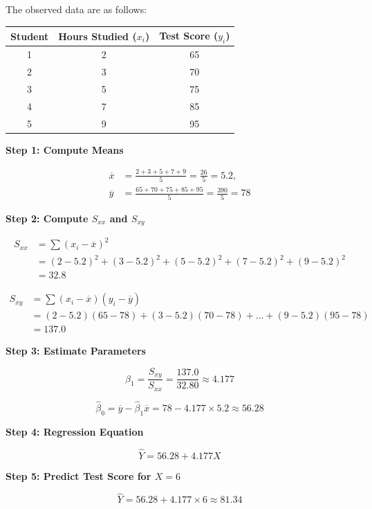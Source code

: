 \documentclass[twoside]{book}
\begin{document}
The observed data are as follows:

\begin{center}
\begin{tabular}{ccc}
\toprule
\textbf{Student} & \textbf{Hours Studied} (\(x_i\)) & \textbf{Test Score} (\(y_i\)) \\
\midrule
1 & 2 & 65 \\
2 & 3 & 70 \\
3 & 5 & 75 \\
4 & 7 & 85 \\
5 & 9 & 95 \\
\bottomrule
\end{tabular}
\end{center}

\textbf{Step 1: Compute Means}

\begin{align*}
    \overline{x} &= \frac{2 + 3 + 5 + 7 + 9}{5} = \frac{26}{5} = 5.2, \\
\overline{y} &= \frac{65 + 70 + 75 + 85 + 95}{5} = \frac{390}{5} = 78
\end{align*}

\textbf{Step 2: Compute $S_{xx}$ and $S_{xy}$}

\begin{align*}
    S_{xx} &= \sum (x_i - \overline{x})^2 \\
    &= (2 - 5.2)^2 + (3 - 5.2)^2 + (5 - 5.2)^2 + (7 - 5.2)^2 + (9 - 5.2)^2 \\
    &= 32.8
\end{align*}

\begin{align*}
    S_{xy} &= \sum (x_i - \overline{x})(y_i - \overline{y}) \\
    &= (2 - 5.2)(65 - 78) + (3 - 5.2)(70 - 78) + \ldots + (9 - 5.2)(95 - 78) \\
    &= 137.0
\end{align*}


\textbf{Step 3: Estimate Parameters}

\[
\hat{\beta}_1 = \frac{S_{xy}}{S_{xx}} = \frac{137.0}{32.80}\approx4.177
\]

\[
\hat{\beta}_0 = \overline{y} - \hat{\beta}_1 \overline{x} = 78-4.177\times 5.2\approx56.28
\]

\textbf{Step 4: Regression Equation}

\[
\hat{Y} = 56.28 + 4.177X
\]

\textbf{Step 5: Predict Test Score for $X = 6$}

\[
\hat{Y} = 56.28 + 4.177\times6 \approx 81.34
\]
\end{document}
